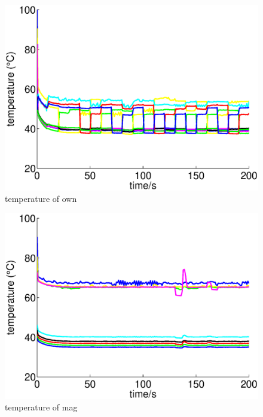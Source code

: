 \begin{figure}
\centering
\includegraphics[width=1\linewidth]{fig/tem_own.eps}
\caption{temperature of own}
\end{figure}

\begin{figure}
\centering
\includegraphics[width=1\linewidth]{fig/tem_mag.eps}
\caption{temperature of mag}
\end{figure}